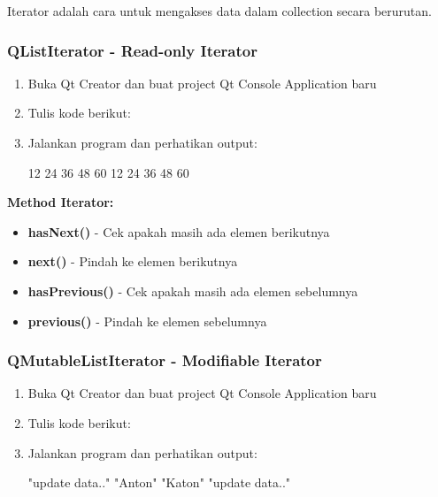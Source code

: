 Iterator adalah cara untuk mengakses data dalam collection secara berurutan.

\subsubsection{QListIterator - Read-only Iterator}

\begin{enumerate}
\item Buka Qt Creator dan buat project Qt Console Application baru
\item Tulis kode berikut:



\item Jalankan program dan perhatikan output:

\begin{lcverbatim}
12
24
36
48
60
12
24
36
48
60
\end{lcverbatim}
\end{enumerate}

\textbf{Method Iterator:}
\begin{itemize}
\item \textbf{hasNext()} - Cek apakah masih ada elemen berikutnya
\item \textbf{next()} - Pindah ke elemen berikutnya
\item \textbf{hasPrevious()} - Cek apakah masih ada elemen sebelumnya
\item \textbf{previous()} - Pindah ke elemen sebelumnya
\end{itemize}

\subsubsection{QMutableListIterator - Modifiable Iterator}

\begin{enumerate}
\item Buka Qt Creator dan buat project Qt Console Application baru
\item Tulis kode berikut:



\item Jalankan program dan perhatikan output:

\begin{lcverbatim}
"update data.."
"Anton"
"Katon"
"update data.."
\end{lcverbatim}
\end{enumerate}

